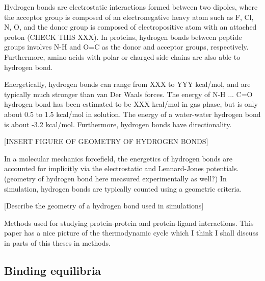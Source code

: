 Hydrogen bonds are electrostatic interactions formed between two dipoles, where the acceptor group is composed of an electronegative heavy atom such as F, Cl, N, O, and the donor group is composed of electropositive atom with an attached proton (CHECK THIS XXX).  In proteins, hydrogen bonds between peptide groups involves N-H and O=C as the donor and acceptor groups, respectively. Furthermore, amino acids with polar or charged side chains are also able to hydrogen bond. 

Energetically, hydrogen bonds can range from XXX to YYY kcal/mol, and are typically much stronger than van Der Waals forces.  The energy of N-H ... C=O hydrogen bond has been estimated to be XXX kcal/mol in gas phase, but is only about 0.5 to 1.5 kcal/mol in solution.\cite{energetics of hydrogen bonds in peptides} The energy of a water-water hydrogen bond is about -3.2 kcal/mol.\cite{where did I see this}
Furthermore, hydrogen bonds have directionality.

[INSERT FIGURE OF GEOMETRY OF HYDROGEN BONDS]


In a molecular mechanics forcefield, the energetics of hydrogen bonds are accounted for implicitly via the electrostatic and Lennard-Jones potentials. (geometry of hydrogen bond here measured experimentally as well?) In simulation, hydrogen bonds are typically counted using a geometric criteria.

[Describe the geometry of a hydrogen bond used in simulations] 

Methods used for studying protein-protein and protein-ligand interactions.\cite{Wang:2001ez}
This paper\cite{Durrant:2011bm} has a nice picture of the thermodynamic cycle which I think I shall discuss in parts of this theses in methods.

\subsection{Binding equilibria}


